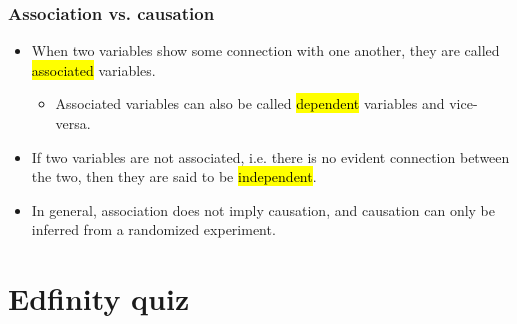 \documentclass[slidestop,compress,mathserif]{beamer}
\begin{document}

\begin{frame}
\frametitle{Association vs. causation}

\begin{itemize}

\item When two variables show some connection with one another, they are called \hl{associated} variables.
\begin{itemize}
\item Associated variables can also be called \hl{dependent} variables and vice-versa.
\end{itemize}

\item If two variables are not associated, i.e. there is no evident connection between the two, then they are said to be \hl{independent}.

\item In general, association does not imply causation, and causation can only be inferred from a randomized experiment.

\end{itemize}

\begin{center}
{\tiny {}}
\end{center}

\end{frame}







\section{Edfinity quiz}


\end{document}
